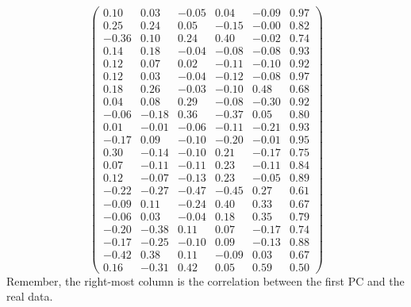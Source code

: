 \begin{equation*}
  \begin{pmatrix}
    0.10 &0.03 &-0.05 &0.04 &-0.09 &0.97 \\ 
    0.25 &0.24 &0.05 &-0.15 &-0.00 &0.82 \\ 
    -0.36 &0.10 &0.24 &0.40 &-0.02 &0.74 \\ 
    0.14 &0.18 &-0.04 &-0.08 &-0.08 &0.93 \\ 
    0.12 &0.07 &0.02 &-0.11 &-0.10 &0.92 \\ 
    0.12 &0.03 &-0.04 &-0.12 &-0.08 &0.97 \\ 
    0.18 &0.26 &-0.03 &-0.10 &0.48 &0.68 \\ 
    0.04 &0.08 &0.29 &-0.08 &-0.30 &0.92 \\ 
    -0.06 &-0.18 &0.36 &-0.37 &0.05 &0.80 \\ 
    0.01 &-0.01 &-0.06 &-0.11 &-0.21 &0.93 \\ 
    -0.17 &0.09 &-0.10 &-0.20 &-0.01 &0.95 \\ 
    0.30 &-0.14 &-0.10 &0.21 &-0.17 &0.75 \\ 
    0.07 &-0.11 &-0.11 &0.23 &-0.11 &0.84 \\ 
    0.12 &-0.07 &-0.13 &0.23 &-0.05 &0.89 \\ 
    -0.22 &-0.27 &-0.47 &-0.45 &0.27 &0.61 \\ 
    -0.09 &0.11 &-0.24 &0.40 &0.33 &0.67 \\ 
    -0.06 &0.03 &-0.04 &0.18 &0.35 &0.79 \\ 
    -0.20 &-0.38 &0.11 &0.07 &-0.17 &0.74 \\ 
    -0.17 &-0.25 &-0.10 &0.09 &-0.13 &0.88 \\ 
    -0.42 &0.38 &0.11 &-0.09 &0.03 &0.67 \\ 
    0.16 &-0.31 &0.42 &0.05 &0.59 &0.50  
  \end{pmatrix}
\end{equation*}
Remember, the right-most column is the correlation between the first PC
and the real data.
